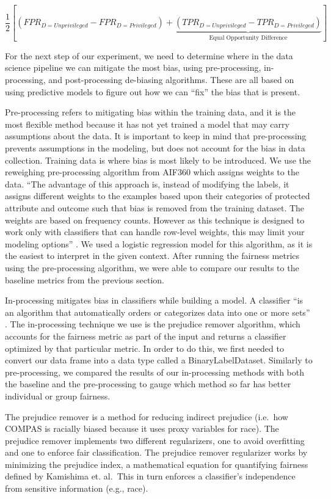 \documentclass[water,article,submit,moreauthors,pdftex]{mdpi}
\begin{document}
\[\frac{1}{2}\left[(FPR_{D = Unprivileged} - FPR_{D = Privileged}) + \underbrace{(TPR_{D = Unprivileged} - TPR_{D = Privileged})}_\textrm{Equal Opportunity Difference}\right]\]

For the next step of our experiment, we need to determine where in the
data science pipeline we can mitigate the most bias, using
pre-processing, in-processing, and post-processing de-biasing
algorithms. These are all based on using predictive models to figure out
how we can ``fix'' the bias that is present.

Pre-processing refers to mitigating bias within the training data, and
it is the most flexible method because it has not yet trained a model
that may carry assumptions about the data. It is important to keep in
mind that pre-processing prevents assumptions in the modeling, but does
not account for the bias in data collection. Training data is where bias
is most likely to be introduced. We use the reweighing pre-processing
algorithm from AIF360 which assigns weights to the data. ``The advantage
of this approach is, instead of modifying the labels, it assigns
different weights to the examples based upon their categories of
protected attribute and outcome such that bias is removed from the
training dataset. The weights are based on frequency counts. However as
this technique is designed to work only with classifiers that can handle
row-level weights, this may limit your modeling options''
\citep{Ronaghan2019AI}. We used a logistic regression model for this
algorithm, as it is the easiest to interpret in the given context. After
running the fairness metrics using the pre-processing algorithm, we were
able to compare our results to the baseline metrics from the previous
section.

In-processing mitigates bias in classifiers while building a model. A
classifier ``is an algorithm that automatically orders or categorizes
data into one or more sets'' \citep{baxter2021AI}. The in-processing
technique we use is the prejudice remover algorithm, which accounts for
the fairness metric as part of the input and returns a classifier
optimized by that particular metric. In order to do this, we first
needed to convert our data frame into a data type called a
BinaryLabelDataset. Similarly to pre-processing, we compared the results
of our in-processing methods with both the baseline and the
pre-processing to gauge which method so far has better individual or
group fairness.

The prejudice remover is a method for reducing indirect prejudice
(i.e.~how COMPAS is racially biased because it uses proxy variables for
race). The prejudice remover implements two different regularizers, one
to avoid overfitting and one to enforce fair classification. The
prejudice remover regularizer works by minimizing the prejudice index, a
mathematical equation for quantifying fairness defined by Kamishima et.
al.~This in turn enforces a classifier's independence from sensitive
information (e.g., race).
\end{document}
